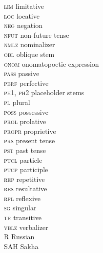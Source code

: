 \documentclass[output=paper,colorlinks,citecolor=brown
\ChapterDOI{10.5281/zenodo.15697577}
]{langscibook}
\begin{document}
\begin{multicols}{2}
\begin{tabbing}
\textsc{lim} \> limitative\\
\textsc{loc} \> locative\\
\textsc{neg} \> negation\\
\textsc{nfut} \> non-future tense\\
\textsc{nmlz} \> nominalizer\\
\textsc{obl} \> oblique stem\\
\textsc{onom} \> onomatopoetic expression\\
\textsc{pass} \> passive\\
\textsc{perf} \> perfective\\
\textsc{ph1, ph2} \> placeholder stems\\
\textsc{pl} \> plural\\
\textsc{poss} \> possessive\\
\textsc{prol} \> prolative\\
\textsc{propr} \> proprietive\\
\textsc{prs} \> present tense\\
\textsc{pst} \> past tense\\
\textsc{ptcl} \> particle\\
\textsc{ptcp} \> participle\\
\textsc{rep} \> repetitive\\
\textsc{res} \> resultative\\
\textsc{rfl} \> reflexive\\
\textsc{sg} \> singular\\
\textsc{tr} \> transitive\\
\textsc{vblz} \> verbalizer\\
\textsc{R} \> Russian\\
\textsc{SAH} \> Sakha
\end{tabbing}
\end{multicols}


\printbibliography[heading=subbibliography,notkeyword=this]
\end{document}
